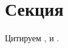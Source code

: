\documentclass{article}
\begin{document}
    \tableofcontents
    \section{Секция}
    Цитируем \cite{pretrained_imagenet}, \cite{imagenet} и \cite{russian_paper}.
    \printbibliography[
        heading=bibintoc,
        title={Список литературы и не только}
    ]
\end{document}
